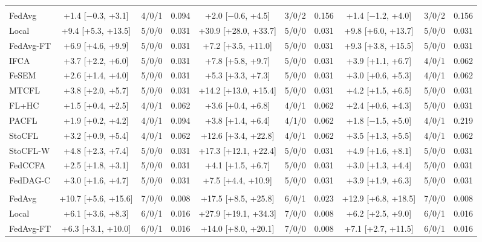 {{\begin{tabular}{l c c c c c c c c c}
\addlinespace
\multicolumn{10}{l}{\textit{(b) Realistic benchmarks}} \\
FedAvg & +1.4 [$-$0.3, +3.1] & 4/0/1 & 0.094 & +2.0 [$-$0.6, +4.5] & 3/0/2 & 0.156 & +1.4 [$-$1.2, +4.0] & 3/0/2 & 0.156 \\
Local & +9.4 [+5.3, +13.5] & 5/0/0 & 0.031 & +30.9 [+28.0, +33.7] & 5/0/0 & 0.031 & +9.8 [+6.0, +13.7] & 5/0/0 & 0.031 \\
FedAvg-FT & +6.9 [+4.6, +9.9] & 5/0/0 & 0.031 & +7.2 [+3.5, +11.0] & 5/0/0 & 0.031 & +9.3 [+3.8, +15.5] & 5/0/0 & 0.031 \\
IFCA & +3.7 [+2.2, +6.0] & 5/0/0 & 0.031 & +7.8 [+5.8, +9.7] & 5/0/0 & 0.031 & +3.9 [+1.1, +6.7] & 4/0/1 & 0.062 \\
FeSEM & +2.6 [+1.4, +4.0] & 5/0/0 & 0.031 & +5.3 [+3.3, +7.3] & 5/0/0 & 0.031 & +3.0 [+0.6, +5.3] & 4/0/1 & 0.062 \\
MTCFL & +3.8 [+2.0, +5.7] & 5/0/0 & 0.031 & +14.2 [+13.0, +15.4] & 5/0/0 & 0.031 & +4.2 [+1.5, +6.5] & 5/0/0 & 0.031 \\
FL+HC & +1.5 [+0.4, +2.5] & 4/0/1 & 0.062 & +3.6 [+0.4, +6.8] & 4/0/1 & 0.062 & +2.4 [+0.6, +4.3] & 5/0/0 & 0.031 \\
PACFL & +1.9 [+0.2, +4.2] & 4/0/1 & 0.094 & +3.8 [+1.4, +6.4] & 4/1/0 & 0.062 & +1.8 [$-$1.5, +5.0] & 4/0/1 & 0.219 \\
StoCFL & +3.2 [+0.9, +5.4] & 4/0/1 & 0.062 & +12.6 [+3.4, +22.8] & 4/0/1 & 0.062 & +3.5 [+1.3, +5.5] & 4/0/1 & 0.062 \\
StoCFL-W & +4.8 [+2.3, +7.4] & 5/0/0 & 0.031 & +17.3 [+12.1, +22.4] & 5/0/0 & 0.031 & +4.9 [+1.6, +8.1] & 5/0/0 & 0.031 \\
FedCCFA & +2.5 [+1.8, +3.1] & 5/0/0 & 0.031 & +4.1 [+1.5, +6.7] & 5/0/0 & 0.031 & +3.0 [+1.3, +4.4] & 5/0/0 & 0.031 \\
FedDAG-C & +3.0 [+1.6, +4.7] & 5/0/0 & 0.031 & +7.5 [+4.4, +10.9] & 5/0/0 & 0.031 & +3.9 [+1.9, +6.3] & 5/0/0 & 0.031 \\
\addlinespace
\multicolumn{10}{l}{\textit{(c) Additional benchmarks}} \\
FedAvg & +10.7 [+5.6, +15.6] & 7/0/0 & 0.008 & +17.5 [+8.5, +25.8] & 6/0/1 & 0.023 & +12.9 [+6.8, +18.5] & 7/0/0 & 0.008 \\
Local & +6.1 [+3.6, +8.3] & 6/0/1 & 0.016 & +27.9 [+19.1, +34.3] & 7/0/0 & 0.008 & +6.2 [+2.5, +9.0] & 6/0/1 & 0.016 \\
FedAvg-FT & +6.3 [+3.1, +10.0] & 6/0/1 & 0.016 & +14.0 [+8.0, +20.1] & 7/0/0 & 0.008 & +7.1 [+2.7, +11.5] & 6/0/1 & 0.016 \\

\end{tabular}}}
